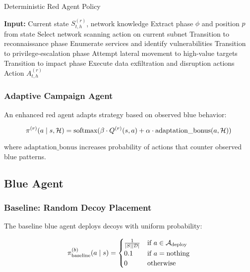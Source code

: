 \documentclass[11pt]{article}
\newcounter{phase}[algorithm]
\theoremstyle{definition}
\theoremstyle{plain}
\begin{document}
\begin{algorithm}
\caption{Deterministic Red Agent Policy}
\begin{algorithmic}[1]
\STATE \textbf{Input:} Current state $S_{t,h}^{(r)}$, network knowledge
\STATE Extract phase $\phi$ and position $p$ from state
    \STATE Select network scanning action on current subnet
        \STATE Transition to reconnaissance phase
    \ENDIF
{}
    \STATE Enumerate services and identify vulnerabilities
        \STATE Transition to privilege-escalation phase
    \ENDIF
{}
    \STATE Attempt lateral movement to high-value targets
        \STATE Transition to impact phase
    \ENDIF
{}
    \STATE Execute data exfiltration and disruption actions
\ENDIF
\RETURN Action $A_{t,h}^{(r)}$
\end{algorithmic}
\end{algorithm}

\subsubsection{Adaptive Campaign Agent}
An enhanced red agent adapts strategy based on observed blue behavior:

\begin{equation}
\pi^{(r)}(a \mid s, \mathcal{H}) = \text{softmax}(\beta \cdot Q^{(r)}(s, a) + \alpha \cdot \text{adaptation\_bonus}(a, \mathcal{H}))
\end{equation}

where $\text{adaptation\_bonus}$ increases probability of actions that counter observed blue patterns.

\subsection{Blue Agent}

\subsubsection{Baseline: Random Decoy Placement}
The baseline blue agent deploys decoys with uniform probability:

\begin{equation}
\pi^{(b)}_{\text{baseline}}(a \mid s) = \begin{cases}
\frac{1}{|S||\mathcal{D}|} & \text{if } a \in \mathcal{A}_{\text{deploy}} \\
0.1 & \text{if } a = \text{nothing} \\
0 & \text{otherwise}
\end{cases}
\end{equation}
\end{document}
